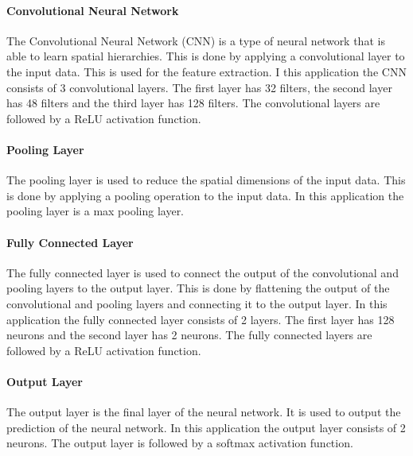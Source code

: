 \paragraph{Convolutional Neural Network}
The Convolutional Neural Network (CNN) is a type of neural network that is able to learn spatial hierarchies. This is done by applying a convolutional layer to the input data. This is used for the feature extraction. I this application the CNN consists of 3 convolutional layers. The first layer has 32 filters, the second layer has 48 filters and the third layer has 128 filters. The convolutional layers are followed by a ReLU activation function.

\paragraph{Pooling Layer}
The pooling layer is used to reduce the spatial dimensions of the input data. This is done by applying a pooling operation to the input data. In this application the pooling layer is a max pooling layer. 

\paragraph{Fully Connected Layer}
The fully connected layer is used to connect the output of the convolutional and pooling layers to the output layer. This is done by flattening the output of the convolutional and pooling layers and connecting it to the output layer. In this application the fully connected layer consists of 2 layers. The first layer has 128 neurons and the second layer has 2 neurons. The fully connected layers are followed by a ReLU activation function.

\paragraph{Output Layer}
The output layer is the final layer of the neural network. It is used to output the prediction of the neural network. In this application the output layer consists of 2 neurons. The output layer is followed by a softmax activation function.






